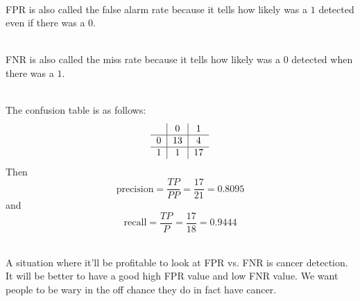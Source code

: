 \documentclass[12pt]{article}
\begin{document}
\begin{enumerate}
 \\
FPR is also called the false alarm rate because it tells how likely was a $1$ detected even if there was a $0$. 

 \\
FNR is also called the miss rate because it tells how likely was a $0$ detected when there was a $1$. 

 \\
The confusion table is as follows: $$ \begin{tabular}{c|c|c} 
& 0 & 1 \\ \hline 
0 & 13 & 4 \\ \hline 
1 & 1 & 17 \\ \end{tabular} $$ 
Then $$ \text{precision} = \frac{TP}{PP} = \frac{17}{21} = 0.8095$$ and $$ \text{recall} = \frac{TP}{P} = \frac{17}{18} = 0.9444$$ 


 \\
A situation where it'll be profitable to look at FPR vs. FNR is cancer detection. It will be better to have a good high FPR value and low FNR value. We want people to be wary in the off chance they do in fact have cancer. 


\end{enumerate}
\end{document}
